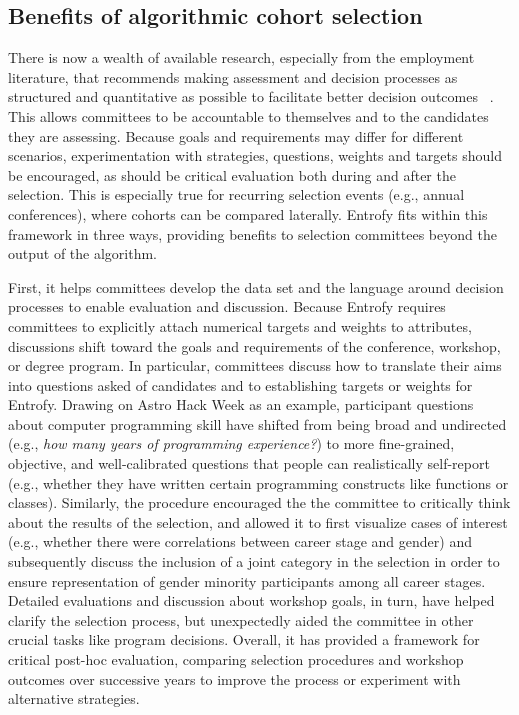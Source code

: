 \documentclass[10pt,letterpaper]{article}
\begin{document}
\subsection*{Benefits of algorithmic cohort selection}
There is now a wealth of available research, especially from the employment literature, that recommends making assessment and decision processes as structured and quantitative as possible to facilitate better decision outcomes ~\cite{sunstein2015wiser}.
This allows committees to be accountable to themselves and to the candidates they are assessing.
Because goals and requirements may differ for different scenarios, experimentation with strategies, questions, weights and targets should be encouraged, as should be critical evaluation both during and after the selection.
This is especially true for recurring selection events (e.g., annual conferences), where cohorts can be compared laterally.
Entrofy fits within this framework in three ways, providing benefits to selection committees beyond the output of the algorithm.

First, it helps committees develop the data set and the language around decision processes to enable evaluation and discussion.
Because Entrofy requires committees to explicitly attach numerical targets and weights to attributes, discussions shift toward the goals and requirements of the conference, workshop, or degree program. In particular, committees discuss how to translate their aims into questions asked of candidates and to establishing targets or weights for Entrofy.
Drawing on Astro Hack Week as an example, participant questions about computer programming skill have shifted from being broad and undirected (e.g., \emph{how many years of programming experience?}) to more fine-grained, objective, and well-calibrated questions that people can realistically self-report (e.g., whether they have written certain programming constructs like functions or classes).
Similarly, the procedure encouraged the the committee to critically think about the results of the selection, and allowed it to first visualize cases of interest (e.g., whether there were correlations between career stage and gender) and subsequently discuss the inclusion of a joint category in the selection in order to ensure representation of gender minority participants among all career stages.
Detailed evaluations and discussion about workshop goals, in turn, have helped clarify the selection process, but unexpectedly aided the committee in other crucial tasks like program decisions. 
Overall, it has provided a framework for critical post-hoc evaluation, comparing selection procedures and workshop outcomes over successive years to improve the process or experiment with alternative strategies.
\end{document}

